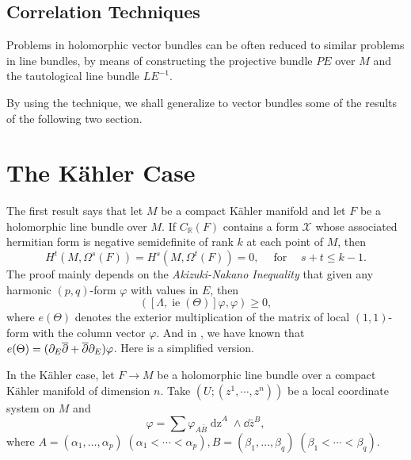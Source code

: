 \documentclass[lang=en,12pt]{beautybook}
\renewcommand{\bd}{\partial}
\begin{document}
\subsection{Correlation Techniques}

\begin{fancybox}
  Problems in holomorphic vector bundles can be often reduced to similar problems in line bundles, by means of constructing the projective bundle $PE$ over $M$ and the tautological line bundle $LE^{-1}$.
\end{fancybox}

By using the technique, we shall generalize to vector bundles some of the results of the following two section.

\section{The K\"ahler Case}
\newcommand{\tmcolor}[2]{{\color{#1}{#2}}}
\newcommand{\tmverbatim}[1]{\text{{\ttfamily{#1}}}}
\newcommand{\tmop}[1]{\ensuremath{\operatorname{#1}}}
\newcommand{\tmstrong}[1]{\textbf{#1}}
\providecommand{\xequal}[2][]{\mathop{=}\limits_{#1}^{#2}}

The first result says that let $M$ be a
compact K\"ahler manifold and let $F$ be a holomorphic line bundle over $M$. If
$C_{\mathbb{R}} (F)$ contains a form $\mathcal{X}$ whose associated hermitian
form is negative semidefinite of rank $k$ at each point of $M$, then
\[ H^t (M, \Omega^s (F)) = H^s (M, \Omega^t (F)) = 0, \quad \tmop{for} \quad
  s + t \leqslant k - 1. \]
The proof mainly depends on the \textit{Akizuki-Nakano Inequality} that given any harmonic $(p,
  q)$-form $\varphi$ with values in $E$, then
\begin{equation}
  ([\Lambda, \tmop{ie} (\Theta)] \varphi, \varphi) \geqslant 0, \label{1}
\end{equation}
where $e(\Theta)$ denotes the exterior multiplication of the matrix of local $(1,1)$-form with the column vector $\varphi$. And in \cite[]{calabi1960compact}, we have known that $e(\Theta)=(\bd_E \bdd+ \bdd\bd_E)\varphi$.
Here is a simplified version.

In the K\"ahler case, let $F \rightarrow M$ be a holomorphic line bundle over a
compact K\"ahler manifold of dimension $n$. Take $(U ; (z^1, \cdots, z^n))$ be a
local coordinate system on $M$ and
\[ \varphi = \sum \varphi_{A \bar{B} } \tmop{dz}^A \wedge
  \dd \bar z^{B}, \]
where $A=(\alpha_1,\ldots,\alpha_p) \; (\alpha_1<\cdots<\alpha_p), B=(\beta_1,\ldots,\beta_q) \; (\beta_1<\cdots<\beta_q)$.
\end{document}
